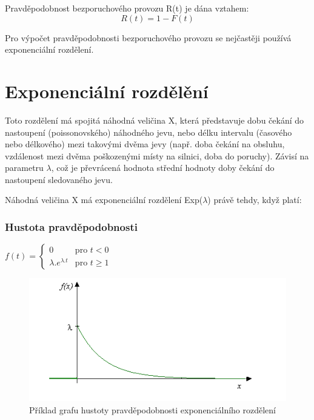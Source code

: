 \documentclass[FM,RP]{tulthesis}
\begin{document}
            Pravděpodobnost bezporuchového provozu R(t) je dána vztahem:
            $$ R(t)=1-F(t) $$

            Pro výpočet pravděpodobnosti bezporuchového provozu se nejčastěji používá exponenciální rozdělení.

    \section*{Exponenciální rozdělění}
        Toto rozdělení má spojitá náhodná veličina X, která představuje dobu čekání do nastoupení (poissonovského) náhodného jevu, 
        nebo délku intervalu (časového nebo délkového) mezi takovými dvěma jevy (např. doba čekání na obsluhu, vzdálenost mezi dvěma poškozenými místy na silnici, doba do poruchy).
        Závisí na parametru $ \lambda $, což je převrácená hodnota střední hodnoty doby čekání do nastoupení sledovaného jevu. \cite{6}

        Náhodná veličina X má exponenciální rozdělení Exp($ \lambda $) právě tehdy, když platí:
        \subsubsection*{Hustota pravděpodobnosti}
        $  f(t) = \left\{ \begin{array}{ll}
            0 & \mbox{pro }t<0 \\
            \lambda.e^{\lambda.t} & \mbox{pro }t\geq 1
            \end{array} \right. $
            \begin{figure}[h]
                \centering
                \includegraphics[scale=0.75]{pic/hustota.png}
                \caption{Příklad grafu hustoty pravděpodobnosti exponenciálního rozdělení} 
            \end{figure}
\end{document}
